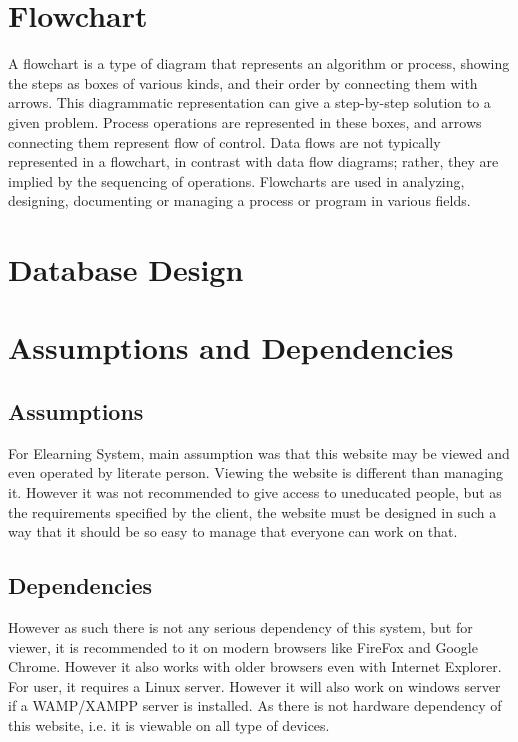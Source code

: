 \section{Flowchart} 
A flowchart is a type of diagram that represents an
algorithm or process, showing the steps as boxes of various kinds, and
their order by connecting them with arrows. This diagrammatic
representation can give a step-by-step solution to a given problem.
Process operations are represented in these boxes, and arrows
connecting them represent flow of control. Data flows are not
typically represented in a flowchart, in contrast with data flow
diagrams; rather, they are implied by the sequencing of operations.
Flowcharts are used in analyzing, designing, documenting or managing a
process or program in various fields.
\newpage
{}
\newpage
{}

\newpage
\section{Database Design}
\newpage
\section{Assumptions and Dependencies}
\subsection{Assumptions}
For Elearning System, main assumption was that this website may be viewed and even operated by literate person. Viewing the website is different than managing it. However it was not recommended to give access to uneducated people, but as the requirements specified by the client, the website must be designed in such a way that it should be so easy to manage that everyone can work on that.
\subsection{Dependencies}
However as such there is not any serious dependency of this system, but for viewer, it is recommended to it on modern browsers like FireFox and Google Chrome. However it also works with older browsers even with Internet Explorer. For user, it requires a Linux server. However it will also work on windows server if a WAMP/XAMPP server is installed.
As there is not hardware dependency of this website, i.e. it is viewable on all type of devices.
